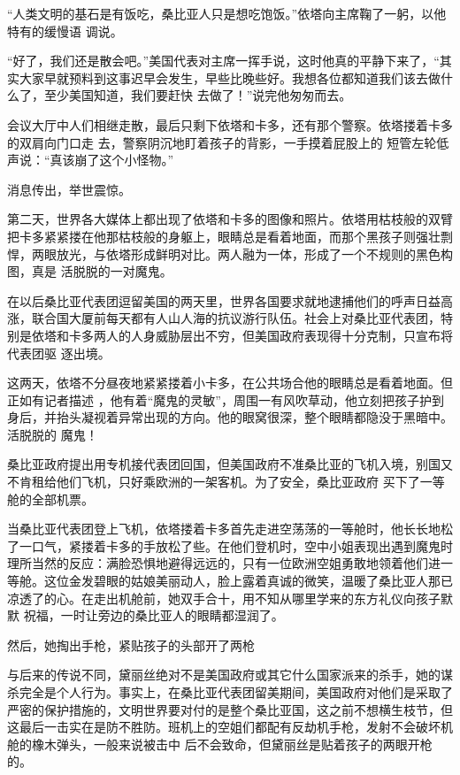 \documentclass{article}
\begin{document}
“人类文明的基石是有饭吃，桑比亚人只是想吃饱饭。”依塔向主席鞠了一躬，以他特有的缓慢语
调说。 

“好了，我们还是散会吧。”美国代表对主席一挥手说，这时他真的平静下来了，“其实大家早就预料到这事迟早会发生，早些比晚些好。我想各位都知道我们该去做什么了，至少美国知道，我们要赶快
去做了！”说完他匆匆而去。 

会议大厅中人们相继走散，最后只剩下依塔和卡多，还有那个警察。依塔搂着卡多的双肩向门口走
\newpage
去，警察阴沉地盯着孩子的背影，一手摸着屁股上的
短管左轮低声说：“真该崩了这个小怪物。” 


消息传出，举世震惊。 

第二天，世界各大媒体上都出现了依塔和卡多的图像和照片。依塔用枯枝般的双臂把卡多紧紧搂在他那枯枝般的身躯上，眼睛总是看着地面，而那个黑孩子则强壮剽悍，两眼放光，与依塔形成鲜明对比。两人融为一体，形成了一个不规则的黑色构图，真是
活脱脱的一对魔鬼。 

在以后桑比亚代表团逗留美国的两天里，世界各国要求就地逮捕他们的呼声日益高涨，联合国大厦前每天都有人山人海的抗议游行队伍。社会上对桑比亚代表团，特别是依塔和卡多两人的人身威胁层出不穷，但美国政府表现得十分克制，只宣布将代表团驱
逐出境。 

这两天，依塔不分昼夜地紧紧搂着小卡多，在公共场合他的眼睛总是看着地面。但正如有记者描述
\newpage
，他有着“魔鬼的灵敏”，周围一有风吹草动，他立刻把孩子护到身后，并抬头凝视着异常出现的方向。他的眼窝很深，整个眼睛都隐没于黑暗中。活脱脱的
魔鬼！ 

桑比亚政府提出用专机接代表团回国，但美国政府不准桑比亚的飞机入境，别国又不肯租给他们飞机，只好乘欧洲的一架客机。为了安全，桑比亚政府
买下了一等舱的全部机票。 

当桑比亚代表团登上飞机，依塔搂着卡多首先走进空荡荡的一等舱时，他长长地松了一口气，紧搂着卡多的手放松了些。在他们登机时，空中小姐表现出遇到魔鬼时理所当然的反应：满脸恐惧地避得远远的，只有一位欧洲空姐勇敢地领着他们进一等舱。这位金发碧眼的姑娘美丽动人，脸上露着真诚的微笑，温暖了桑比亚人那已凉透了的心。在走出机舱前，她双手合十，用不知从哪里学来的东方礼仪向孩子默默
祝福，一时让旁边的桑比亚人的眼睛都湿润了。 

然后，她掏出手枪，紧贴孩子的头部开了两枪
\newpage


与后来的传说不同，黛丽丝绝对不是美国政府或其它什么国家派来的杀手，她的谋杀完全是个人行为。事实上，在桑比亚代表团留美期间，美国政府对他们是采取了严密的保护措施的，文明世界要对付的是整个桑比亚国，这之前不想横生枝节，但这最后一击实在是防不胜防。班机上的空姐们都配有反劫机手枪，发射不会破坏机舱的橡木弹头，一般来说被击中
后不会致命，但黛丽丝是贴着孩子的两眼开枪的。 
\end{document}
